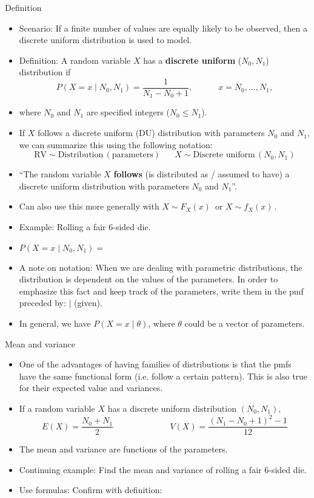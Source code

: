 \documentclass{article}
\newcommand{\follow}[1]{\sim \text{#1}\,}		%
\begin{document}
Definition\bigskip
\begin{itemize}
    \item Scenario: If a finite number of values are equally likely to be observed, then a discrete uniform distribution is used to model.\bigskip
    \item Definition: A random variable $X$ has a \textbf{discrete uniform} ($N_0, N_1$) distribution if
    \[P(X = x \mid N_0, N_1) = \frac{1}{N_1 - N_0 + 1}, \quad\quad\quad x = N_0, \ldots, N_1,\]
    \item[] where $N_0$ and $N_1$ are specified integers ($N_0 \le N_1$).
    \item If $X$ follows a discrete uniform (DU) distribution with parameters $N_0$ and $N_1$, we can summarize this using the following notation:
    \[\text{RV}\follow{Distribution}(\text{parameters}) \hspace{20pt} X \follow{Discrete uniform}(N_0, N_1)\]
    \item[] ``The random variable $X$ \textbf{follows} (is distributed as / assumed to have) a discrete uniform distribution with parameters $N_0$ and $N_1$''.
    \item[] Can also use this more generally with $X \follow{$F_X(x)$}$ or $X \follow{$f_X(x)$}$.
    \item Example: Rolling a fair 6-sided die.\bigskip
    \item[] $P(X = x \mid N_0, N_1) = $\bigskip
    \item A note on notation: When we are dealing with parametric distributions, the distribution is dependent on the values of the parameters. In order to emphasize this fact and keep track of the parameters, write them in the pmf preceded by: $\mid$ (given).
    \item[] In general, we have $P(X = x \mid \theta)$, where $\theta$ could be a vector of parameters.
\end{itemize}\bigskip

Mean and variance\bigskip
\begin{itemize}
    \item One of the advantages of having families of distributions is that the pmfs have the same functional form (i.e. follow a certain pattern). This is also true for their expected value and variances.
    \item If a random variable $X$ has a discrete uniform distribution $(N_0, N_1)$,\smallskip
    \[E(X) = \frac{N_0 + N_1}{2} \hspace{80pt} V(X) = \frac{(N_1 - N_0 +1)^2 -1}{12}\]
    \item The mean and variance are functions of the parameters.
    \item Continuing example: Find the mean and variance of rolling a fair 6-sided die.
    \item[] Use formulas: \hspace{150pt} Confirm with definition:\vspace{60pt}
\end{itemize}\bigskip
\end{document}
